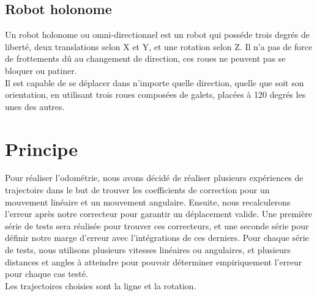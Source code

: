 \documentclass[10pt,a4paper]{article}
\begin{document}
\subsection{Robot holonome}
Un robot holonome ou omni-directionnel est un robot qui posséde trois degrés de liberté, deux translations selon X et Y, et une rotation selon Z. Il n'a pas de force de frottements dû au changement de direction, ces roues ne peuvent pas se bloquer ou patiner.\\
Il est capable de se déplacer dans n'importe quelle direction, quelle que soit son orientation, en utilisant trois roues composées de galets, placées à 120 degrés les unes des autres.\\


\section{Principe}

Pour réaliser l'odométrie, nous avons décidé de réaliser plusieurs expériences de trajectoire dans le but de trouver les coefficients de correction pour un mouvement linéaire et un mouvement angulaire. Ensuite, nous recalculerons l'erreur après notre correcteur pour garantir un déplacement valide. Une première série de tests sera réalisée pour trouver ces correcteurs, et une seconde série pour définir notre marge d’erreur avec l’intégrations de ces derniers. Pour chaque série de tests, nous utilisons plusieurs vitesses linéaires ou angulaires, et plusieurs distances et angles à atteindre pour pouvoir déterminer empiriquement l'erreur pour chaque cas testé.\\ 
Les trajectoires choisies sont la ligne et la rotation.\\
\end{document}
